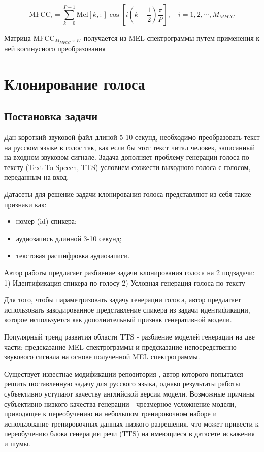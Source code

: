 \documentclass[oneside,final,14pt]{extreport}
\begin{document}
$$
\begin{equation}
\mathrm{MFCC}_{i}=\sum_{k=0}^{P-1} \text{Mel}[k,:] \cos \left[i\left(k-\frac{1}{2}\right) \frac{\pi}{P}\right], \quad i=1,2, \cdots, M_{MFCC}
\end{equation}
$$

Матрица $\mathrm{MFCC}_{ M_{MFCC} \times W }$ получается из MEL спектрограммы путем применения к ней косинусного преобразования\cite{bib:MFCC_choice}



\chapter{Клонирование голоса}
\section{Постановка задачи}
\label{chap:task_def}
Дан короткий звуковой файл длиной 5-10 секунд, необходимо преобразовать текст на русском языке в голос так, как если бы этот текст читал человек, записанный на входном звуковом сигнале. Задача дополняет проблему генерации голоса по тексту (Text To Speech, TTS) условием схожести выходного голоса с голосом, переданным на вход. 

Датасеты для решение задачи клонирования голоса представляют из себя такие признаки как:

\begin{itemize}
\item номер (id) спикера;
\item аудиозапись длинной 3-10 секунд;
\item текстовая расшифровка аудиозаписи.
\end{itemize} 

Автор работы \cite{bib:voice_cloning} предлагает разбиение задачи клонирования голоса на 2 подзадачи:
1) Идентификация спикера по голосу
2) Условная генерация голоса по тексту

Для того, чтобы параметризовать задачу генерации голоса, автор предлагает использовать закодированное представление спикера из задачи идентификации, которое используется как дополнительный признак генеративной модели.

Популярный тренд развития области TTS - разбиение моделей генерации на две части: предсказание MEL-спектрограммы и предсказание непосредственно звукового сигнала на основе полученной MEL спектрограммы.

Существует известнае модификации репозитория \cite{bib:voice_cloning}, автор которого попытался решить поставленную задачу для русского языка\cite{bib:russian_voice_cloning}, однако результаты работы субъективно уступают качеству английской версии модели. Возможные причины субъективно низкого качества генерации - чрезмерное усложнение модели, приводящее к переобучению на небольшом тренировочном наборе и использование тренировочных данных низкого разрешения, что может привести к переобучению блока генерации речи (TTS) на имеющиеся в датасете искажения и шумы.
\end{document}
